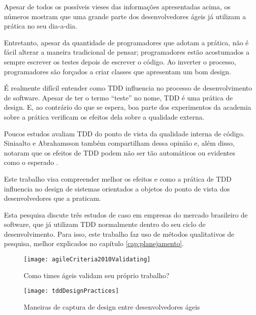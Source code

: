 Apesar de todos os possíveis vieses das informações apresentadas acima, os
números mostram que uma grande parte dos desenvolvedores ágeis já utilizam a 
prática no seu dia-a-dia.

Entretanto, apesar da quantidade de programadores que adotam a prática, não é
fácil alterar a maneira tradicional de pensar; programadores estão acostumados a
sempre escrever os testes depois de escrever o código. Ao inverter o processo,
programadores são forçados a criar classes que apresentam um bom design.

É realmente difícil entender como TDD influencia no processo de desenvolvimento
de software. Apesar de ter o termo ``teste'' no nome, TDD é uma prática
de design. E, ao contrário do que se espera, boa parte dos experimentos da
academia sobre a prática verificam os efeitos dela sobre a qualidade externa. 

Poucos estudos avaliam TDD do ponto de vista da qualidade interna de código.
Siniaalto e Abrahamsson também compartilham dessa opinião e, além disso, notaram
que os efeitos de TDD podem não ser tão automáticos ou evidentes como o 
esperado \cite{alarming-results}.

Este trabalho visa compreender melhor os efeitos e como a prática de TDD
influencia no design de sistemas orientados a objetos do ponto de vista dos
desenvolvedores que a praticam. 

Esta pesquisa discute três estudos de caso em empresas do mercado brasileiro de
software, que já utilizam TDD normalmente dentro do seu ciclo de
desenvolvimento. Para isso, este trabalho faz uso de métodos qualitativos de
pesquisa, melhor explicados no capítulo \ref{cap:planejamento}.

\begin{figure}[ht]
  \begin{minipage}[b]{0.45\linewidth}
    \centering
    \texttt{[image: agileCriteria2010Validating]}
    \caption{Como times ágeis validam seu próprio trabalho?}
    \label{fig:wambler-agile-2010}
  \end{minipage}
  \hspace{0.5cm}
  \begin{minipage}[b]{0.45\linewidth}
    \centering
    \texttt{[image: tddDesignPractices]}
    \caption{Maneiras de captura de design entre desenvolvedores ágeis}  
    \label{fig:wambler-tdd-2008}
  \end{minipage}
\end{figure}			

